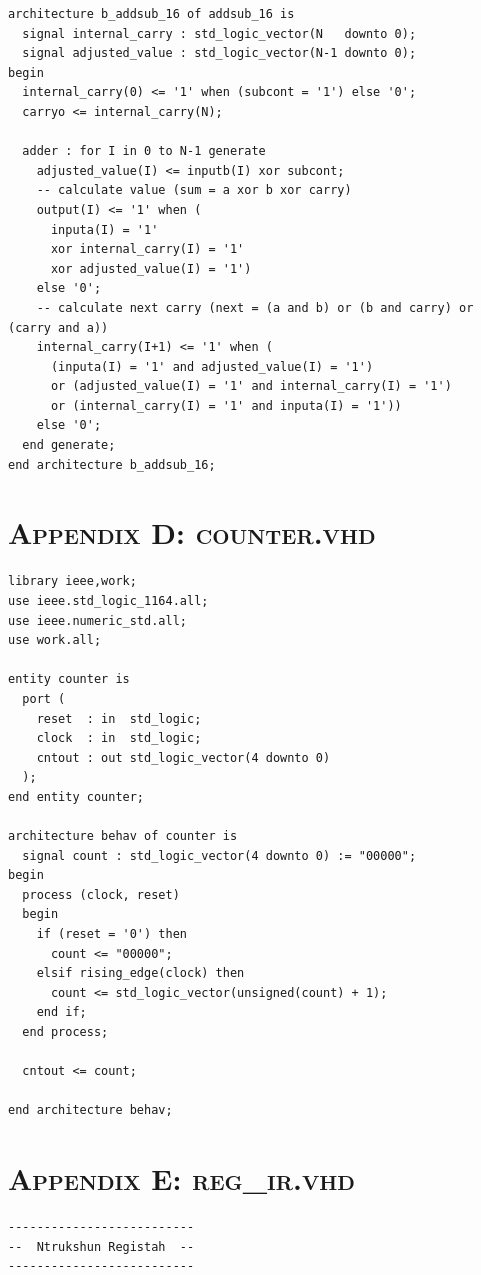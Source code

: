 \documentclass[11pt]{report}
\begin{document}
\begin{spacing}{1.5}
\begin{lstlisting}
architecture b_addsub_16 of addsub_16 is
  signal internal_carry : std_logic_vector(N   downto 0);
  signal adjusted_value : std_logic_vector(N-1 downto 0);
begin
  internal_carry(0) <= '1' when (subcont = '1') else '0';
  carryo <= internal_carry(N);

  adder : for I in 0 to N-1 generate
    adjusted_value(I) <= inputb(I) xor subcont;
    -- calculate value (sum = a xor b xor carry)
    output(I) <= '1' when (
      inputa(I) = '1'
      xor internal_carry(I) = '1'
      xor adjusted_value(I) = '1')
    else '0';
    -- calculate next carry (next = (a and b) or (b and carry) or (carry and a))
    internal_carry(I+1) <= '1' when (
      (inputa(I) = '1' and adjusted_value(I) = '1')
      or (adjusted_value(I) = '1' and internal_carry(I) = '1')
      or (internal_carry(I) = '1' and inputa(I) = '1'))
    else '0';
  end generate;
end architecture b_addsub_16;

\end{lstlisting}

\chapter*{\scshape Appendix D: counter.vhd}
\label{app:a}
\vspace{15px}
\begin{lstlisting}
library ieee,work;
use ieee.std_logic_1164.all;
use ieee.numeric_std.all;
use work.all;

entity counter is
  port (
    reset  : in  std_logic;
    clock  : in  std_logic;
    cntout : out std_logic_vector(4 downto 0)
  );
end entity counter;

architecture behav of counter is
  signal count : std_logic_vector(4 downto 0) := "00000";
begin
  process (clock, reset)
  begin
    if (reset = '0') then
      count <= "00000";
    elsif rising_edge(clock) then
      count <= std_logic_vector(unsigned(count) + 1);
    end if;
  end process;

  cntout <= count;

end architecture behav;
\end{lstlisting}

\chapter*{\scshape Appendix E: reg\_ir.vhd}
\label{app:a}
\vspace{15px}
\begin{lstlisting}
--------------------------
--  Ntrukshun Registah  --
--------------------------


\end{lstlisting}
\end{spacing}
\end{document}
